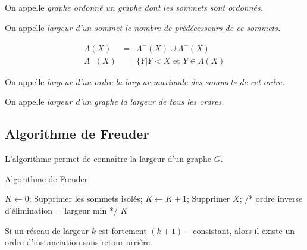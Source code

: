 \begin{df}
    On appelle \em{graphe ordonné} un graphe dont les sommets sont ordonnés.
\end{df}
\begin{df}
    On appelle \em{largeur d'un sommet} le nombre de prédécesseurs de ce sommets.
\end{df}
\begin{note}
    \begin{displaymath}
        \begin{array}{rcl}
            \Lambda (X) & = & \Lambda^-(X) \cup \Lambda^+(X)\\
            \Lambda^-(X) & = & \{Y | Y < X \mbox{ et } Y \in \Lambda(X)
        \end{array}
    \end{displaymath}
\end{note}
\begin{df}
    On appelle \em{largeur d'un ordre} la largeur maximale des sommets de cet ordre.
\end{df}
\begin{df}
    On appelle \em{largeur d'un graphe} la largeur de tous les ordres.
\end{df}

\subsection{Algorithme de Freuder}

L'algorithme permet de connaître la largeur d'un graphe $G$.

\begin{algorithm}
    \caption{Algorithme de Freuder}
    \label{algo_freuder}
    \begin{algorithmic}[1]
        \State $K \gets 0$;
        \State Supprimer les sommets isolés;
            \State $K \gets K + 1$;
                \State Supprimer $X$;
            \EndWhile
        \EndWhile
        \State /* ordre inverse d'élimination = largeur min */
        \State \Return $K$
    \end{algorithmic}
\end{algorithm}


\begin{thrm}
    Si un réseau de largeur $k$ est fortement $(k+1)-$consistant, alors il existe un ordre
    d'instanciation sans retour arrière.
\end{thrm}

